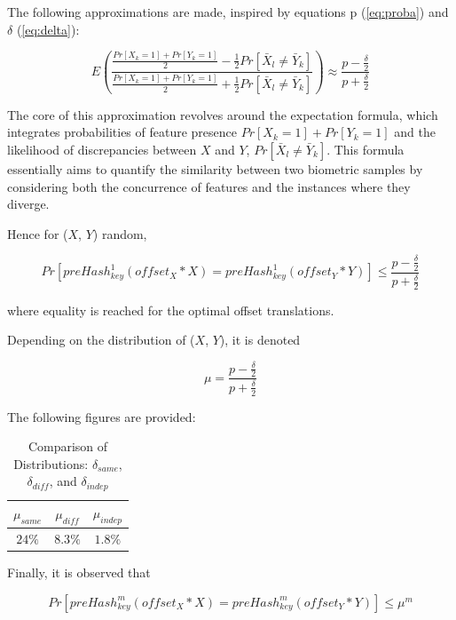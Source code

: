 The following approximations are made, inspired by equations p (\ref{eq:proba}) and $\delta$ (\ref{eq:delta}):

\begin{equation}
    E\left(\frac{\frac{Pr[X_k = 1] + Pr[Y_k = 1]}{2} - \frac{1}{2}Pr[\bar{X}_l \neq \bar{Y}_k]}{\frac{Pr[X_k = 1] + Pr[Y_k = 1]}{2} + \frac{1}{2}Pr[\bar{X}_l \neq \bar{Y}_k]}\right) \approx \frac{p - \frac{\delta}{2}}{p + \frac{\delta}{2}}
\end{equation}

The core of this approximation revolves around the expectation formula, which integrates probabilities of feature presence \(Pr[X_k=1]+Pr[Y_k=1]\) and the likelihood of discrepancies between \(X\) and \(Y\), \(Pr[\bar{X}_l \neq \bar{Y}_k]\). This formula essentially aims to quantify the similarity between two biometric samples by considering both the concurrence of features and the instances where they diverge.

Hence for (\(X\), \(Y\)) random,

\begin{equation}
    \label{eq:mu_leq}
    Pr[preHash_{key}^1(offset_X * X) = preHash_{key}^1(offset_Y * Y)] \leq \frac{p - \frac{\delta}{2}}{p + \frac{\delta}{2}}
\end{equation}

where equality is reached for the optimal offset translations. 

Depending on the distribution of (\(X\), \(Y\)), it is denoted

\begin{equation} \label{eq:mu}
    \mu = \frac{p - \frac{\delta}{2}}{p + \frac{\delta}{2}}
\end{equation}

The following figures are provided:

\begin{table}[H]
    \centering
    \renewcommand{\arraystretch}{1.25}\begin{tabular}{|c|c|c|}
        \hline
        $\mu_{same}$ & $\mu_{diff}$ & $\mu_{indep}$\\
        \hline
        $24\%$ & $8.3\%$ & $1.8\%$\\
        \hline
    \end{tabular}
\caption{Comparison of Distributions: $\delta_{same}$, $\delta_{diff}$, and $\delta_{indep}$}
\end{table}

Finally, it is observed that

\begin{equation}
    Pr[preHash_{key}^m(offset_X * X) = preHash_{key}^m(offset_Y * Y)] \leq \mu^m
\end{equation}

